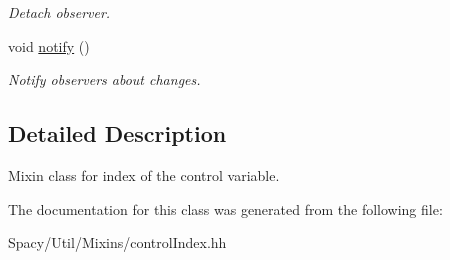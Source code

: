 \begin{DoxyCompactItemize}
\begin{DoxyCompactList}\small\item\em Detach observer. \end{DoxyCompactList}\item 
\hypertarget{classSpacy_1_1Mixin_1_1MixinConnection_a1ddeaa78a3bb4a38c2cca36d1f99fe36}{}void \hyperlink{classSpacy_1_1Mixin_1_1MixinConnection_a1ddeaa78a3bb4a38c2cca36d1f99fe36}{notify} ()\label{classSpacy_1_1Mixin_1_1MixinConnection_a1ddeaa78a3bb4a38c2cca36d1f99fe36}

\begin{DoxyCompactList}\small\item\em Notify observers about changes. \end{DoxyCompactList}\end{DoxyCompactItemize}


\subsection{Detailed Description}
Mixin class for index of the control variable. 

The documentation for this class was generated from the following file\+:\begin{DoxyCompactItemize}
\item 
Spacy/\+Util/\+Mixins/control\+Index.\+hh\end{DoxyCompactItemize}
